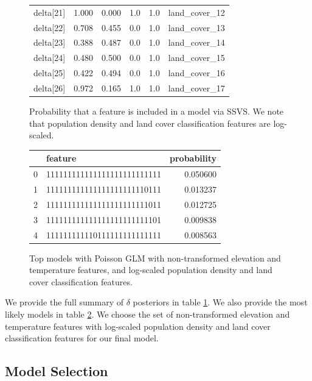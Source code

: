 \documentclass[notitlepage]{article}
\begin{document}
\begin{figure}[H]
\begin{tabular}{lrrrrl}
delta[21] &  1.000 &  0.000 &     1.0 &      1.0 &       land\_cover\_12 \\
delta[22] &  0.708 &  0.455 &     0.0 &      1.0 &       land\_cover\_13 \\
delta[23] &  0.388 &  0.487 &     0.0 &      1.0 &       land\_cover\_14 \\
delta[24] &  0.480 &  0.500 &     0.0 &      1.0 &       land\_cover\_15 \\
delta[25] &  0.422 &  0.494 &     0.0 &      1.0 &       land\_cover\_16 \\
delta[26] &  0.972 &  0.165 &     1.0 &      1.0 &       land\_cover\_17 \\
\bottomrule
\end{tabular}
\caption{Probability that a feature is included in a model via SSVS. We note that population density and land cover classification features are log-scaled.}
\label{table:delta_values}
\end{figure}

\begin{figure}[H]
\centering
\begin{tabular}{llr}
\toprule
{} &                      feature &  probability \\
\midrule
0 &  111111111111111111111111111 &     0.050600 \\
1 &  111111111111111111111110111 &     0.013237 \\
2 &  111111111111111111111111011 &     0.012725 \\
3 &  111111111111111111111111101 &     0.009838 \\
4 &  111111111110111111111111111 &     0.008563 \\
\bottomrule
\end{tabular}
\caption{Top models with Poisson GLM with non-transformed elevation and temperature features, and log-scaled population density and land cover classification features.}
\label{table:svss_model}
\end{figure}

We provide the full summary of $\delta$ posteriors in table \ref{table:delta_values}.
We also provide the most likely models in table \ref{table:svss_model}.
We choose the set of non-transformed elevation and temperature features with log-scaled population density and land cover classification features for our final model. 

\subsection{Model Selection}
\label{model_selection}
\end{document}
